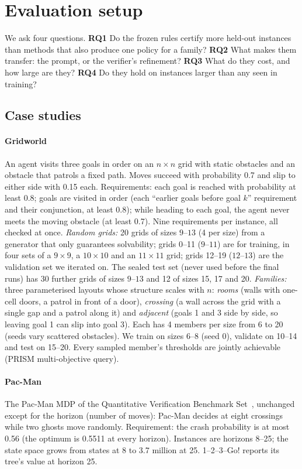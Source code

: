 \section{Evaluation setup}\label{sec:evaluation}

We ask four questions.
\textbf{RQ1} Do the frozen rules certify more held-out instances than methods that also produce one policy for a
family? \textbf{RQ2} What makes them transfer: the prompt, or the verifier's refinement?
\textbf{RQ3} What do they cost, and how large are they? \textbf{RQ4} Do they hold on instances larger than any seen
in training?

\subsection{Case studies}
\paragraph*{Gridworld}
An agent visits three goals in order on an $n\times n$ grid with static obstacles and an obstacle that patrols a fixed
path. Moves succeed with probability 0.7 and slip to either side with 0.15 each. Requirements: each goal is reached
with probability at least 0.8; goals are visited in order (each ``earlier goals before goal $k$'' requirement and
their conjunction, at least 0.8); while heading to each goal, the agent never meets the moving obstacle (at least
0.7). Nine requirements per instance, all checked at once.
\emph{Random grids:} 20 grids of sizes $9$--$13$ (4 per size) from a generator that only guarantees solvability;
grids 0--11 ($9$--$11$) are for training, in four sets of a $9\times 9$, a $10\times 10$ and an $11\times 11$ grid;
grids 12--19 ($12$--$13$) are the validation set we iterated on. The sealed test set (never used before the final
runs) has 30 further grids of sizes $9$--$13$ and 12 of sizes 15, 17 and 20.
\emph{Families:} three parameterised layouts whose structure scales with $n$: \emph{rooms} (walls with one-cell doors,
a patrol in front of a door), \emph{crossing} (a wall across the grid with a single gap and a patrol along it) and
\emph{adjacent} (goals 1 and 3 side by side, so leaving goal 1 can slip into goal 3). Each has 4 members per size from
6 to 20 (seeds vary scattered obstacles). We train on sizes 6--8 (seed 0), validate on 10--14 and test on 15--20.
Every sampled member's thresholds are jointly achievable (PRISM multi-objective query).

\paragraph*{Pac-Man}
The Pac-Man MDP of the Quantitative Verification Benchmark Set~\cite{hartmanns2019qcomp}, unchanged except for the
horizon (number of moves): Pac-Man decides at eight crossings while two ghosts move randomly. Requirement: the
crash probability is at most 0.56 (the optimum is 0.5511 at every horizon). Instances are horizons 8--25; the state
space grows from  states at 8 to 3.7 million at 25. 1--2--3--Go! reports its tree's value at horizon 25.

